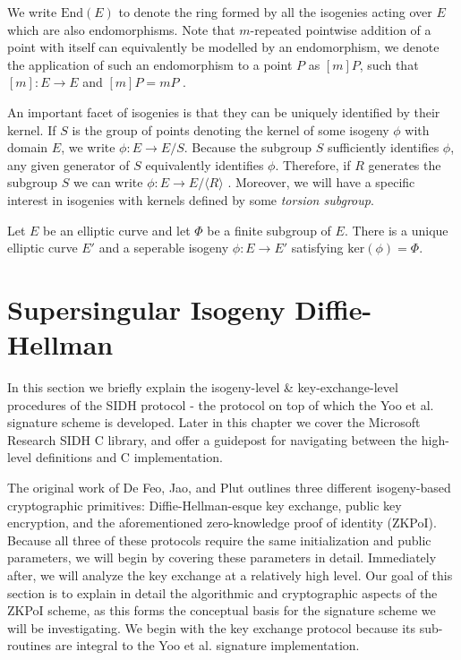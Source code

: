 We write $\text{End}(E)$ to denote the ring formed by all the isogenies acting over $E$ which are also endomorphisms. Note that $m$-repeated pointwise addition of a point with itself can equivalently be modelled by an endomorphism, we denote the application of such an endomorphism to a point $P$ as $[m]P$, such that $[m]: E \rightarrow E$ and $[m]P = mP$ \cite{silverman}.

An important facet of isogenies is that they can be uniquely identified by their kernel. If $S$ is the group of points denoting the kernel of some isogeny $\phi$ with domain $E$, we write $\phi: E \rightarrow E/S$. Because the subgroup $S$ sufficiently identifies $\phi$, any given generator of $S$ equivalently identifies $\phi$. Therefore, if $R$ generates the subgroup $S$ we can write $\phi: E \rightarrow E/\langle R \rangle$ \cite{silverman}. Moreover, we will have a specific interest in isogenies with kernels defined by some \emph{torsion subgroup}.

\begin{tcolorbox}
\begin{lemma}
\label{lem:isogkern}
Let $E$ be an elliptic curve and let $\Phi$ be a finite subgroup of $E$. There is a unique elliptic curve $E'$ and a seperable isogeny $\phi: E \rightarrow E'$ satisfying $\text{ker}(\phi) = \Phi$.
\end{lemma}
\end{tcolorbox}

\section{Supersingular Isogeny Diffie-Hellman}
\label{sec:sidh}

In this section we briefly explain the isogeny-level \& key-exchange-level procedures of the SIDH protocol - the protocol on top of which the Yoo et al. signature scheme is developed. Later in this chapter we cover the Microsoft Research SIDH C library, and offer a guidepost for navigating between the high-level definitions and C implementation.

The original work of De Feo, Jao, and Plut \cite{djp} outlines three different isogeny-based cryptographic primitives: Diffie-Hellman-esque key exchange, public key encryption, and the aforementioned zero-knowledge proof of identity (ZKPoI). Because all three of these protocols require the same initialization and public parameters, we will begin by covering these parameters in detail. Immediately after, we will analyze the key exchange at a relatively high level. Our goal of this section is to explain in detail the algorithmic and cryptographic aspects of the ZKPoI scheme, as this forms the conceptual basis for the signature scheme we will be investigating. We begin with the key exchange protocol because its sub-routines are integral to the Yoo et al. signature implementation.

